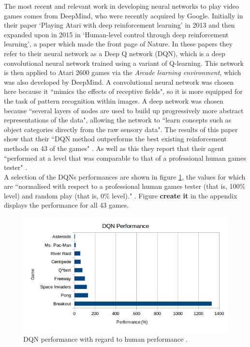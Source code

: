 \documentclass[10pt]{article}
\begin{document}
		The most recent and relevant work in developing neural networks to play video games comes from DeepMind, who were recently acquired by Google. Initially in their paper `Playing Atari with deep reinforcement learning' in 2013 and then expanded upon in 2015 in `Human-level control through deep reinforcement learning', a paper which made the front page of Nature. In these papers they refer to their neural network as a Deep Q network (DQN), which is a deep convolutional neural network trained using a variant of Q-learning. This network is then applied to Atari 2600 games via the \textit{Arcade learning environment}, which was also developed by DeepMind. A convolutional neural network was chosen here because it ``mimics the effects of receptive fields"\cite{humanlevel}, so it is more equipped for the task of pattern recognition within images. A deep network was chosen because ``several layers of nodes are used to build up progressively more abstract representations of the data"\cite{humanlevel}, allowing the network to ``learn concepts such as object categories directly from the raw sensory data"\cite{humanlevel}. The results of this paper show that their ``DQN method outperforms the best existing reinforcement methods on 43 of the games" \cite{humanlevel}. As well as this they report that their agent ``performed at a level that was comparable to that of a professional human games tester" \cite{humanlevel}.\\
		
		 A selection of the DQNs performances are shown in figure \ref{fig:performance}, the values for which are ``normalised with respect to a professional human games tester (that is, 100\% level) and random play (that is, 0\% level)." \cite{humanlevel}. Figure \textbf{create it} in the appendix displays the performance for all 43 games.
		
		\begin{figure}[h]				
			\includegraphics[scale=0.7]{img/deepMindPerformance}
			\centering
			\caption{DQN performance with regard to human performance \cite{humanlevel}.}
			\label{fig:performance}
		\end{figure}
		
\end{document}
